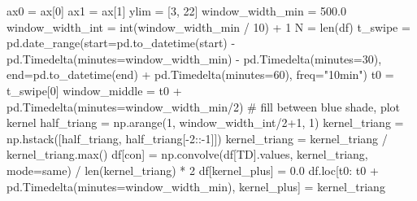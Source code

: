 \documentclass[
  letterpaper,
  DIV=11,
  numbers=noendperiod,
  oneside]{scrreprt}
\newenvironment{Shaded}{\begin{snugshade}}{\end{snugshade}}
\newcommand{\BuiltInTok}[1]{\textcolor[rgb]{0.00,0.23,0.31}{#1}}
\newcommand{\CommentTok}[1]{\textcolor[rgb]{0.37,0.37,0.37}{#1}}
\newcommand{\DecValTok}[1]{\textcolor[rgb]{0.68,0.00,0.00}{#1}}
\newcommand{\FloatTok}[1]{\textcolor[rgb]{0.68,0.00,0.00}{#1}}
\newcommand{\NormalTok}[1]{\textcolor[rgb]{0.00,0.23,0.31}{#1}}
\newcommand{\OperatorTok}[1]{\textcolor[rgb]{0.37,0.37,0.37}{#1}}
\newcommand{\StringTok}[1]{\textcolor[rgb]{0.13,0.47,0.30}{#1}}
\begin{document}
\begin{Shaded}
\begin{Highlighting}[]
\NormalTok{ax0 }\OperatorTok{=}\NormalTok{ ax[}\DecValTok{0}\NormalTok{]}
\NormalTok{ax1 }\OperatorTok{=}\NormalTok{ ax[}\DecValTok{1}\NormalTok{]}
\NormalTok{ylim }\OperatorTok{=}\NormalTok{ [}\DecValTok{3}\NormalTok{, }\DecValTok{22}\NormalTok{]}
\NormalTok{window\_width\_min }\OperatorTok{=} \FloatTok{500.0}
\NormalTok{window\_width\_int }\OperatorTok{=} \BuiltInTok{int}\NormalTok{(window\_width\_min }\OperatorTok{/} \DecValTok{10}\NormalTok{) }\OperatorTok{+} \DecValTok{1}
\NormalTok{N }\OperatorTok{=} \BuiltInTok{len}\NormalTok{(df)}
\NormalTok{t\_swipe }\OperatorTok{=}\NormalTok{ pd.date\_range(start}\OperatorTok{=}\NormalTok{pd.to\_datetime(start) }\OperatorTok{{-}}\NormalTok{ pd.Timedelta(minutes}\OperatorTok{=}\NormalTok{window\_width\_min) }\OperatorTok{{-}}\NormalTok{ pd.Timedelta(minutes}\OperatorTok{=}\DecValTok{30}\NormalTok{),}
\NormalTok{                        end}\OperatorTok{=}\NormalTok{pd.to\_datetime(end) }\OperatorTok{+}\NormalTok{ pd.Timedelta(minutes}\OperatorTok{=}\DecValTok{60}\NormalTok{),}
\NormalTok{                        freq}\OperatorTok{=}\StringTok{"10min"}\NormalTok{)}
\NormalTok{t0 }\OperatorTok{=}\NormalTok{ t\_swipe[}\DecValTok{0}\NormalTok{]}
\NormalTok{window\_middle }\OperatorTok{=}\NormalTok{ t0 }\OperatorTok{+}\NormalTok{ pd.Timedelta(minutes}\OperatorTok{=}\NormalTok{window\_width\_min}\OperatorTok{/}\DecValTok{2}\NormalTok{)}
\CommentTok{\# fill between blue shade, plot kernel}
\NormalTok{half\_triang }\OperatorTok{=}\NormalTok{ np.arange(}\DecValTok{1}\NormalTok{, window\_width\_int}\OperatorTok{/}\DecValTok{2}\OperatorTok{+}\DecValTok{1}\NormalTok{, }\DecValTok{1}\NormalTok{)}
\NormalTok{kernel\_triang }\OperatorTok{=}\NormalTok{ np.hstack([half\_triang, half\_triang[}\OperatorTok{{-}}\DecValTok{2}\NormalTok{::}\OperatorTok{{-}}\DecValTok{1}\NormalTok{]])}
\NormalTok{kernel\_triang }\OperatorTok{=}\NormalTok{ kernel\_triang }\OperatorTok{/}\NormalTok{ kernel\_triang.}\BuiltInTok{max}\NormalTok{()}
\NormalTok{df[}\StringTok{\textquotesingle{}con\textquotesingle{}}\NormalTok{] }\OperatorTok{=}\NormalTok{ np.convolve(df[}\StringTok{\textquotesingle{}TD\textquotesingle{}}\NormalTok{].values, kernel\_triang, mode}\OperatorTok{=}\StringTok{\textquotesingle{}same\textquotesingle{}}\NormalTok{) }\OperatorTok{/} \BuiltInTok{len}\NormalTok{(kernel\_triang) }\OperatorTok{*} \DecValTok{2}
\NormalTok{df[}\StringTok{\textquotesingle{}kernel\_plus\textquotesingle{}}\NormalTok{] }\OperatorTok{=} \FloatTok{0.0}
\NormalTok{df.loc[t0: t0 }\OperatorTok{+}\NormalTok{ pd.Timedelta(minutes}\OperatorTok{=}\NormalTok{window\_width\_min), }\StringTok{\textquotesingle{}kernel\_plus\textquotesingle{}}\NormalTok{] }\OperatorTok{=}\NormalTok{ kernel\_triang}


\end{Highlighting}
\end{Shaded}
\end{document}
